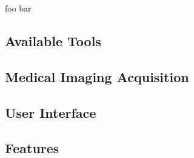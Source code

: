 foo bar

\subsection{\label{sec::ApproachAvailableTools}Available Tools}


\subsection{\label{sec::ApproachAcquisition}Medical Imaging Acquisition}

\subsection{\label{sec::ApproachUserInterface}User Interface}

\subsection{\label{sec::ApproachFeatures}Features}
